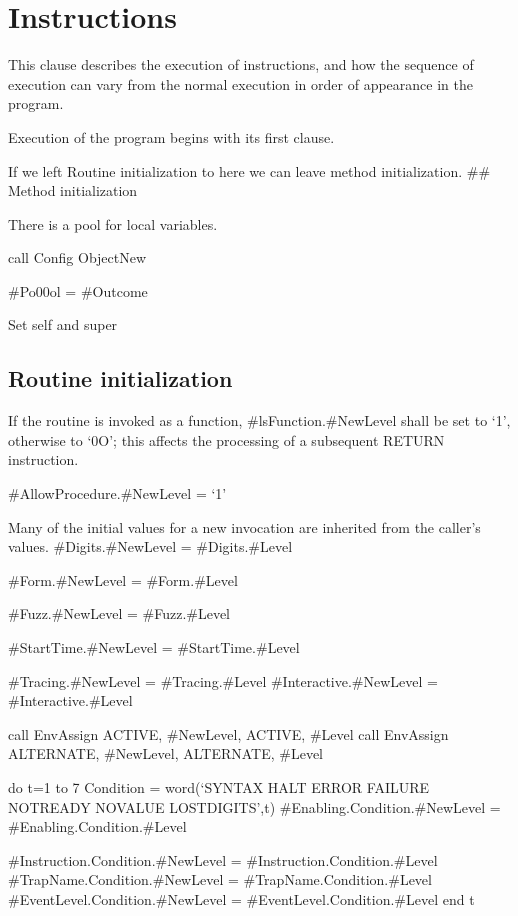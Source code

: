 \chapter{Instructions}\label{instructions}

This clause describes the execution of instructions, and how the
sequence of execution can vary from the normal execution in order of
appearance in the program.

Execution of the program begins with its first clause.

If we left Routine initialization to here we can leave method
initialization. \#\# Method initialization

There is a pool for local variables.

call Config ObjectNew

\#Po00ol = \#Outcome

Set self and super

\section{Routine initialization}\label{routine-initialization}

If the routine is invoked as a function, \#lsFunction.\#NewLevel shall
be set to `1', otherwise to `0O'; this affects the processing of a
subsequent RETURN instruction.

\#AllowProcedure.\#NewLevel = `1'

Many of the initial values for a new invocation are inherited from the
caller's values. \#Digits.\#NewLevel = \#Digits.\#Level

\#Form.\#NewLevel = \#Form.\#Level

\#Fuzz.\#NewLevel = \#Fuzz.\#Level

\#StartTime.\#NewLevel = \#StartTime.\#Level

\#Tracing.\#NewLevel = \#Tracing.\#Level \#Interactive.\#NewLevel =
\#Interactive.\#Level

call EnvAssign ACTIVE, \#NewLevel, ACTIVE, \#Level call EnvAssign
ALTERNATE, \#NewLevel, ALTERNATE, \#Level

do t=1 to 7 Condition = word(`SYNTAX HALT ERROR FAILURE NOTREADY NOVALUE
LOSTDIGITS',t) \#Enabling.Condition.\#NewLevel =
\#Enabling.Condition.\#Level

\#Instruction.Condition.\#NewLevel = \#Instruction.Condition.\#Level
\#TrapName.Condition.\#NewLevel = \#TrapName.Condition.\#Level
\#EventLevel.Condition.\#NewLevel = \#EventLevel.Condition.\#Level end t

